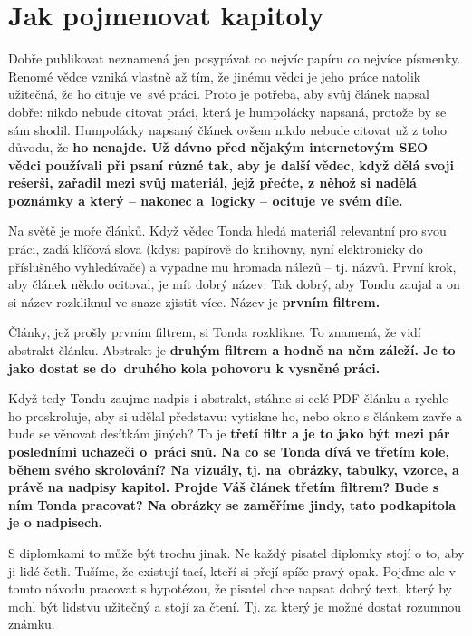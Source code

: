 \section{Jak pojmenovat kapitoly}
Dobře publikovat neznamená jen posypávat co nejvíc papíru co nejvíce písmenky. Renomé vědce vzniká vlastně až tím, že jinému vědci je jeho práce natolik užitečná, že ho cituje ve~své práci. Proto je potřeba, aby svůj článek napsal dobře: nikdo nebude citovat práci, která je humpolácky napsaná, protože by se sám shodil.
Humpolácky napsaný článek ovšem nikdo nebude citovat už z toho důvodu, že \bf ho nenajde\rm . Už dávno před nějakým internetovým SEO vědci používali při psaní různé  tak, aby je další vědec, když dělá svoji rešerši, zařadil mezi svůj materiál, jejž přečte, z něhož si nadělá poznámky a který -- nakonec a~logicky -- ocituje ve svém díle.

Na světě je moře článků. Když vědec Tonda hledá materiál relevantní pro svou práci, zadá klíčová slova (kdysi papírově do knihovny, nyní elektronicky do příslušného vyhledávače) a vypadne mu hromada nálezů -- tj. názvů. První krok, aby článek někdo ocitoval, je mít dobrý název. Tak dobrý, aby Tondu zaujal a on si název rozkliknul ve snaze zjistit více. Název je \bf prvním filtrem\rm .

Články, jež prošly prvním filtrem, si Tonda rozklikne. To znamená, že vidí abstrakt článku. Abstrakt je \bf druhým filtrem \rm a hodně na něm záleží. Je to jako dostat se do~druhého kola pohovoru k vysněné práci.

Když tedy Tondu zaujme nadpis i abstrakt, stáhne si celé PDF článku a rychle ho proskroluje, aby si udělal představu: vytiskne ho, nebo okno s článkem zavře a bude se věnovat desítkám jiných? To je \bf třetí filtr \rm a je to jako být mezi pár posledními uchazeči o~práci snů. Na co se Tonda dívá ve třetím kole, během svého skrolování? Na vizuály, tj. na~obrázky, tabulky, vzorce, a právě na nadpisy kapitol. Projde Váš článek třetím filtrem? Bude s ním Tonda pracovat? Na obrázky se zaměříme jindy, tato podkapitola je o nadpisech.

S diplomkami to může být trochu jinak. Ne každý pisatel diplomky stojí o to, aby ji lidé četli. Tušíme, že existují tací, kteří si přejí spíše pravý opak. Pojďme ale v tomto návodu pracovat s hypotézou, že pisatel chce napsat dobrý text, který by mohl být lidstvu užitečný a stojí za čtení. Tj. za který je možné dostat rozumnou známku.


